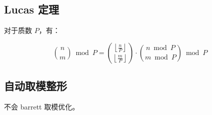 \inputminted[mathescape]{cpp}{src/math/fast_gcd.hpp}

\subsection{Lucas 定理}

对于质数 $P$，有：

\[
\binom{n}{m}\bmod P =
\binom{\left\lfloor\frac{n}{P}\right\rfloor}{\left\lfloor\frac{m}{P}\right\rfloor}
\cdot \binom{n\bmod P}{m\bmod P}\bmod P
\]

\subsection{自动取模整形}

不会 barrett 取模优化。

\inputminted{cpp}{src/math/static_modint.hpp}
